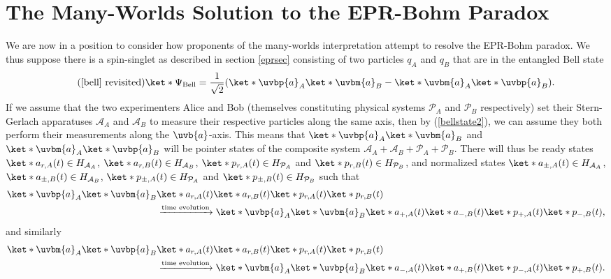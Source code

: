 \documentclass[12pt]{report}
\begin{document}
\section{The Many-Worlds Solution to the EPR-Bohm Paradox}
We are now in a position to consider how proponents of the many-worlds interpretation attempt to resolve the EPR-Bohm paradox. We thus suppose there is a spin-singlet as described in section \ref{eprsec} consisting of two particles $q_A$ and $q_B$ that are in the entangled Bell state 
\begin{equation}\tag{\ref{bell} revisited}
      \ket*{\Psi_{\text{Bell}}}=\frac{1}{\sqrt{2}}(\ket*{\uvbp{a}}_A\ket*{\uvbm{a}}_B-\ket*{\uvbm{a}}_A\ket*{\uvbp{a}}_B).
\end{equation}
If we assume that the two experimenters Alice and Bob (themselves constituting physical systems $\mathcal{P}_A$ and $\mathcal{P}_B$ respectively) set their Stern-Gerlach apparatuses $\mathcal{A}_A$ and $\mathcal{A}_B$  %
%
to measure their respective particles along the same axis, then by (\ref{bellstate2}), we can assume they both perform their measurements along the $\uvb{a}$-axis. This means that $\ket*{\uvbp{a}}_A\ket*{\uvbm{a}}_B$ and $\ket*{\uvbm{a}}_A\ket*{\uvbp{a}}_B$ will be pointer states of the composite system $\mathcal{A}_A+\mathcal{A}_B+\mathcal{P}_A+\mathcal{P}_B$. There will thus be ready states $\ket*{a_{r,A}(t)}\in H_{\mathcal{A}_A}$, $\ket*{a_{r,B}(t)}\in H_{\mathcal{A}_B}$, $\ket*{p_{r,A}(t)}\in H_{\mathcal{P}_A}$ and $\ket*{p_{r,B}(t)}\in H_{\mathcal{P}_B}$, and normalized states  $\ket*{a_{\pm,A}(t)}\in H_{\mathcal{A}_A}$, $\ket*{a_{\pm,B}(t)}\in H_{\mathcal{A}_B}$, $\ket*{p_{\pm,A}(t)}\in H_{\mathcal{P}_A}$ and $\ket*{p_{\pm,B}(t)}\in H_{\mathcal{P}_B}$ such that  
\begin{align*}\ket*{\uvbp{a}}_A\ket*{\uvbm{a}}_B&\ket*{a_{r,A}(t)}\ket*{a_{r,B}(t)}\ket*{p_{r, A}(t)}\ket*{p_{r, B}(t)}\\ &\xrightarrow{\text{time evolution}}\ket*{\uvbp{a}}_A\ket*{\uvbm{a}}_B\ket*{a_{+,A}(t)}\ket*{a_{-,B}(t)}\ket*{p_{+, A}(t)}\ket*{p_{-, B}(t)},\end{align*}
and similarly
\begin{align*}\ket*{\uvbm{a}}_A\ket*{\uvbp{a}}_B&\ket*{a_{r,A}(t)}\ket*{a_{r,B}(t)}\ket*{p_{r, A}(t)}\ket*{p_{r, B}(t)}\\ &\xrightarrow{\text{time evolution}}\ket*{\uvbm{a}}_A\ket*{\uvbp{a}}_B\ket*{a_{-,A}(t)}\ket*{a_{+,B}(t)}\ket*{p_{-, A}(t)}\ket*{p_{+, B}(t)}.\end{align*}
\end{document}
